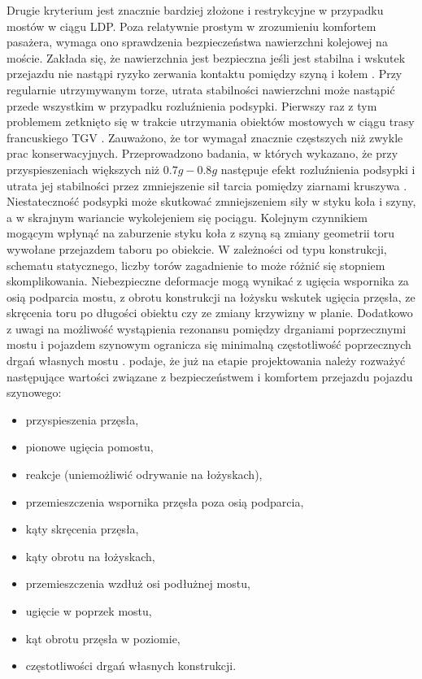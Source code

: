 Drugie kryterium jest znacznie bardziej złożone i restrykcyjne w przypadku mostów w ciągu LDP. Poza relatywnie prostym w zrozumieniu komfortem pasażera, wymaga ono sprawdzenia bezpieczeństwa nawierzchni kolejowej na moście. Zakłada się, że nawierzchnia jest bezpieczna jeśli jest stabilna i wskutek przejazdu nie nastąpi ryzyko zerwania kontaktu pomiędzy szyną i kołem \parencite{Ramondenc2008}. Przy regularnie utrzymywanym torze, utrata stabilności nawierzchni może nastąpić przede wszystkim w przypadku rozluźnienia podsypki. Pierwszy raz z tym problemem zetknięto się w trakcie utrzymania obiektów mostowych w ciągu trasy francuskiego TGV \parencite{Ramondenc1998}. Zauważono, że tor wymagał znacznie częstszych niż zwykle prac konserwacyjnych. Przeprowadzono badania, w których wykazano, że przy przyspieszeniach większych niż $0.7g-0.8g$ następuje efekt rozluźnienia podsypki i utrata jej stabilności przez zmniejszenie sił tarcia pomiędzy ziarnami kruszywa \parencite{Zacher2008}. Niestateczność podsypki może skutkować zmniejszeniem siły w styku koła i szyny, a w skrajnym wariancie wykolejeniem się pociągu. Kolejnym czynnikiem mogącym wpłynąć na zaburzenie styku koła z szyną są zmiany geometrii toru wywołane przejazdem taboru po obiekcie. W zależności od typu konstrukcji, schematu statycznego, liczby torów zagadnienie to może różnić się stopniem skomplikowania. Niebezpieczne deformacje mogą wynikać z ugięcia wspornika za osią podparcia mostu, z obrotu konstrukcji na łożysku wskutek ugięcia przęsła, ze skręcenia toru po długości obiektu czy ze zmiany krzywizny w planie. Dodatkowo z uwagi na możliwość wystąpienia rezonansu pomiędzy drganiami poprzecznymi mostu i pojazdem szynowym ogranicza się minimalną częstotliwość poprzecznych drgań własnych mostu \parencite{Goicolea2003,Dias2007,Dias2008}. 
\parencite{Niemierko} podaje, że już na etapie projektowania należy rozważyć następujące wartości związane z bezpieczeństwem i komfortem przejazdu pojazdu szynowego:
\begin{itemize}[noitemsep]
	\item przyspieszenia przęsła,
	\item pionowe ugięcia pomostu,
	\item reakcje (uniemożliwić odrywanie na łożyskach),
	\item przemieszczenia wspornika przęsła poza osią podparcia,
	\item kąty skręcenia przęsła,
	\item kąty obrotu na łożyskach,
	\item przemieszczenia wzdłuż osi podłużnej mostu,
	\item ugięcie w poprzek mostu,
	\item kąt obrotu przęsła w poziomie,
	\item częstotliwości drgań własnych konstrukcji.
\end{itemize}

